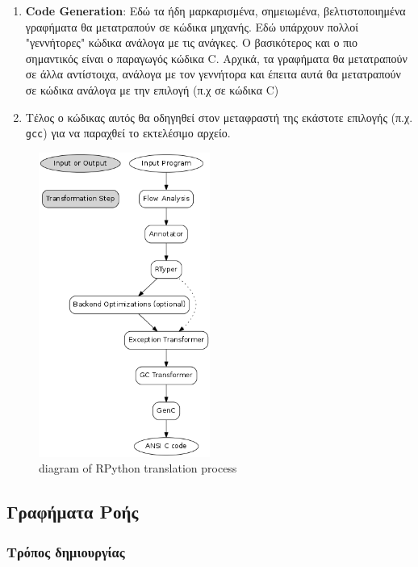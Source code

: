 \begin{enumerate}
\begin{itemize}
\end{itemize}

\item \textbf{Code Generation}: Εδώ τα ήδη μαρκαρισμένα, σημειωμένα,
βελτιστοποιημένα γραφήματα θα μετατραπούν σε κώδικα μηχανής. Εδώ υπάρχουν 
πολλοί "γεννήτορες" κώδικα ανάλογα με τις ανάγκες. Ο βασικότερος και ο πιο 
σημαντικός είναι ο παραγωγός κώδικα C. Αρχικά, τα γραφήματα θα μετατραπούν σε 
άλλα αντίστοιχα, ανάλογα με τον γεννήτορα και έπειτα αυτά θα μετατραπούν σε
κώδικα ανάλογα με την επιλογή (π.χ σε κώδικα C)

\item Τέλος ο κώδικας αυτός θα οδηγηθεί στον μεταφραστή της εκάστοτε επιλογής
(π.χ. \texttt{gcc}) για να παραχθεί το εκτελέσιμο αρχείο.

\end{enumerate}

\begin{figure}[h]
\centering
\includegraphics[width=0.5\textwidth]{diagram.png}
\caption{diagram of RPython translation process}
\label{figure-1}
\end{figure}

\subsection{Γραφήματα Ροής}

\subsubsection{Τρόπος δημιουργίας}


